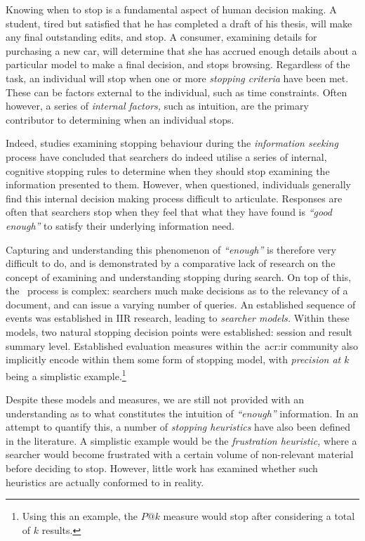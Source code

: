 
\begin{preamble}
{}
Knowing when to stop is a fundamental aspect of human decision making. A student, tired but satisfied that he has completed a draft of his thesis, will make any final outstanding edits, and stop. A consumer, examining details for purchasing a new car, will determine that she has accrued enough details about a particular model to make a final decision, and stops browsing. Regardless of the task, an individual will stop when one or more \emph{stopping criteria} have been met. These can be factors external to the individual, such as time constraints. Often however, a series of \emph{internal factors,} such as intuition, are the primary contributor to determining when an individual stops.

Indeed, studies examining stopping behaviour during the \emph{information seeking} process have concluded that searchers do indeed utilise a series of internal, cognitive stopping rules to determine when they should stop examining the information presented to them. However, when questioned, individuals generally find this internal decision making process difficult to articulate. Responses are often that searchers stop when they feel that what they have found is \emph{``good enough''} to satisfy their underlying information need.

Capturing and understanding this phenomenon of \emph{``enough''} is therefore very difficult to do, and is demonstrated by  a comparative lack of research on the concept of examining and understanding stopping during search. On top of this, the~ process is complex: searchers much make decisions as to the relevancy of a document, and can issue a varying number of queries. An established sequence of events was established in IIR research, leading to \emph{searcher models.} Within these models, two natural stopping decision points were established: session and result summary level. Established evaluation measures within the~\gls{acr:ir} community also implicitly encode within them some form of stopping model, with \emph{precision at $k$} being a simplistic example.\footnote{Using this an example, the $P@k$ measure would stop after considering a total of $k$ results.}

Despite these models and measures, we are still not provided with an understanding as to what constitutes the intuition of \emph{``enough''} information. In an attempt to quantify this, a number of \emph{stopping heuristics} have also been defined in the literature. A simplistic example would be the \emph{frustration heuristic,} where a searcher would become frustrated with a certain volume of non-relevant material before deciding to stop. However, little work has examined whether such heuristics are actually conformed to in reality.


\end{preamble}
